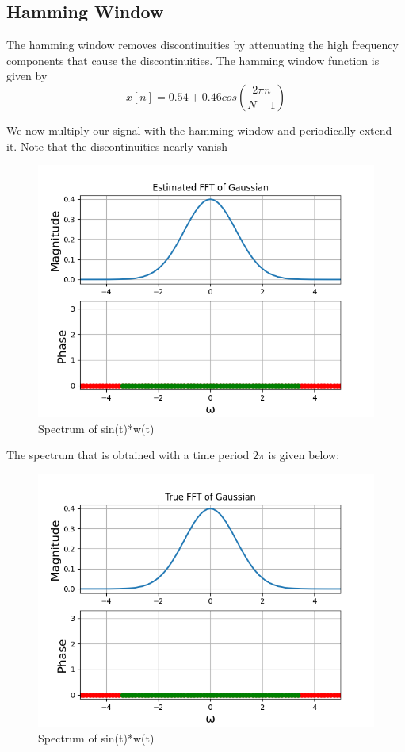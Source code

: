 \documentclass{article}
\begin{document}
\subsection{Hamming Window}
The hamming window removes discontinuities by attenuating the high frequency components that cause the discontinuities.
The hamming window function is given by
\begin{equation}
    x[n] = 0.54 + 0.46cos(\frac{2\pi n}{N-1})
\end{equation}

We now multiply our signal with the hamming window and periodically extend it. Note that the discontinuities nearly vanish
\begin{figure}[h!]
\centering
\includegraphics[scale=0.6]{Figure_5.png}
\caption{Spectrum of sin(t)*w(t)}
\label{fig:universe}
\end{figure}
\clearpage

The spectrum that is obtained with a time period $2\pi$ is given below:
\begin{figure}[h!]
\centering
\includegraphics[scale=0.6]{Figure_6.png}
\caption{Spectrum of sin(t)*w(t)}
\label{fig:universe}
\end{figure}
\end{document}
